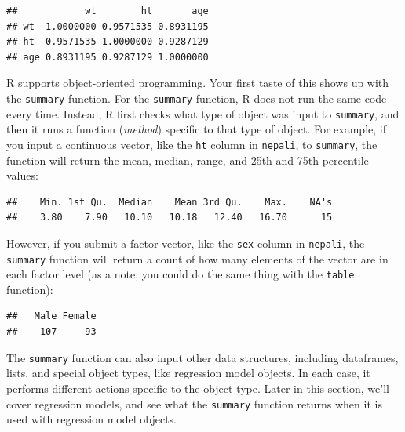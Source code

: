 \documentclass[]{book}
\makeatletter
\newenvironment{Shaded}{\begin{snugshade}}{\end{snugshade}}
\newcommand{\KeywordTok}[1]{\textcolor[rgb]{0.13,0.29,0.53}{\textbf{#1}}}
\newcommand{\OperatorTok}[1]{\textcolor[rgb]{0.81,0.36,0.00}{\textbf{#1}}}
\newcommand{\NormalTok}[1]{#1}
\newenvironment{kframe}{%
\medskip{}
\setlength{\fboxsep}{.8em}
 \def\at@end@of@kframe{}%
 \ifinner\ifhmode%
  \def\at@end@of@kframe{\end{minipage}}%
  \begin{minipage}{\columnwidth}%
 \fi\fi%
 \def\FrameCommand##1{\hskip\@totalleftmargin \hskip-\fboxsep
 \colorbox{shadecolor}{##1}\hskip-\fboxsep
     \hskip-\linewidth \hskip-\@totalleftmargin \hskip\columnwidth}%
 \MakeFramed {\advance\hsize-\width
   \@totalleftmargin\z@ \linewidth\hsize
   \@setminipage}}%
 {\par\unskip\endMakeFramed%
 \at@end@of@kframe}
\renewenvironment{Shaded}{\begin{kframe}}{\end{kframe}}
\theoremstyle{definition}
\theoremstyle{definition}
\theoremstyle{definition}
\theoremstyle{remark}
\makeatother
\begin{document}
\begin{verbatim}
##            wt        ht       age
## wt  1.0000000 0.9571535 0.8931195
## ht  0.9571535 1.0000000 0.9287129
## age 0.8931195 0.9287129 1.0000000
\end{verbatim}

R supports object-oriented programming. Your first taste of this shows
up with the \texttt{summary} function. For the \texttt{summary}
function, R does not run the same code every time. Instead, R first
checks what type of object was input to \texttt{summary}, and then it
runs a function (\emph{method}) specific to that type of object. For
example, if you input a continuous vector, like the \texttt{ht} column
in \texttt{nepali}, to \texttt{summary}, the function will return the
mean, median, range, and 25th and 75th percentile values:

\begin{Shaded}
\end{Shaded}

\begin{verbatim}
##    Min. 1st Qu.  Median    Mean 3rd Qu.    Max.    NA's 
##    3.80    7.90   10.10   10.18   12.40   16.70      15
\end{verbatim}

However, if you submit a factor vector, like the \texttt{sex} column in
\texttt{nepali}, the \texttt{summary} function will return a count of
how many elements of the vector are in each factor level (as a note, you
could do the same thing with the \texttt{table} function):

\begin{Shaded}
\end{Shaded}

\begin{verbatim}
##   Male Female 
##    107     93
\end{verbatim}

The \texttt{summary} function can also input other data structures,
including dataframes, lists, and special object types, like regression
model objects. In each case, it performs different actions specific to
the object type. Later in this section, we'll cover regression models,
and see what the \texttt{summary} function returns when it is used with
regression model objects.
\end{document}
